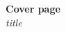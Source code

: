 \documentclass[14pt]{article}
\author{Dylan Garza}
\date
\begin{document}
\begin{titlepage}
   \begin{center}
      \Large\textbf{Cover page}\\
      \large\textit{ title }
   \end{center}
\end{titlepage}
\end{document}
